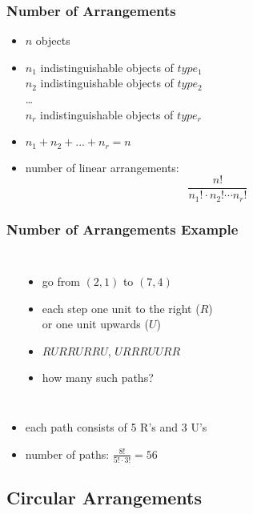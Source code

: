 \documentclass[dvipsnames]{beamer}
\begin{document}
\begin{frame}
  \frametitle{Number of Arrangements}

  \begin{itemize}
    \item $n$ objects
    \item $n_1$ indistinguishable objects of $type_1$\\
      $n_2$ indistinguishable objects of $type_2$\\
      \ldots\\
      $n_r$ indistinguishable objects of $type_r$
    \item $n_1 + n_2 + ... + n_r = n$

    \pause
    \medskip
    \item number of linear arrangements:
    \begin{equation*}
      \frac{n!}{n_1! \cdot n_2! \cdots n_r!}
    \end{equation*}
  \end{itemize}
\end{frame}

\begin{frame}
  \frametitle{Number of Arrangements Example}

  \begin{columns}[t]
    \begin{center}
    \end{center}

    \begin{itemize}
      \item go from $(2,1)$ to $(7,4)$
      \item each step one unit to the right ($R$)\\
        or one unit upwards ($U$)
      \item $RURRURRU$, $URRRUURR$
      \item how many such paths?
    \end{itemize}
  \end{columns}

  \pause
  \medskip
  \begin{itemize}
    \item each path consists of 5 R's and 3 U's
    \item number of paths: $\frac{8!}{5! \cdot 3!} = 56$
  \end{itemize}
\end{frame}

\subsection{Circular Arrangements}
\end{document}

